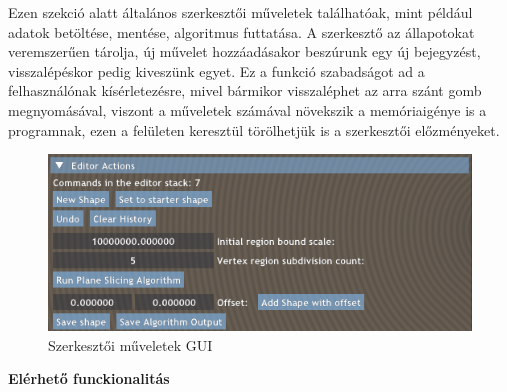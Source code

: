 Ezen szekció alatt általános szerkesztői műveletek találhatóak, mint például adatok betöltése, mentése, algoritmus futtatása. A szerkesztő az állapotokat veremszerűen tárolja, új művelet hozzáadásakor beszúrunk egy új bejegyzést, visszalépéskor pedig kiveszünk egyet. Ez a funkció szabadságot ad a felhasználónak kísérletezésre, mivel bármikor visszaléphet az arra szánt gomb megnyomásával, viszont a műveletek számával növekszik a memóriaigénye is a programnak, ezen a felületen keresztül törölhetjük is a szerkesztői előzményeket.

\begin{figure}[H]
    \centering
    \includegraphics[width=0.85\linewidth]{images/editor_actions.png}
    \caption{Szerkesztői műveletek GUI}
    \label{fig:editor_actions-1}
\end{figure}

\textbf{Elérhető funckionalitás}

